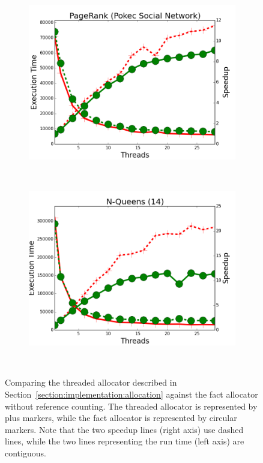 \begin{figure}[h]
\begin{subfigure}[b]{\smallplotsize\textwidth}
                \includegraphics[width=\textwidth]{experiments/scalability/no-refs-allocator-pagerank-pokec.png}
                \label{fig:implementation:no_refs_pagerank}
        \end{subfigure}
        ~
        \begin{subfigure}[b]{\smallplotsize\textwidth}
                \includegraphics[width=\textwidth]{experiments/scalability/no-refs-allocator-8queens-14.png}
                \label{fig:implementation:no_refs_queens}
        \end{subfigure} \\

        \caption{Comparing the threaded allocator described in
           Section~\ref{section:implementation:allocation} against the fact
           allocator without reference counting. The threaded allocator is
           represented by plus markers, while the fact allocator is represented
           by circular markers. Note that the two speedup lines (right axis) use
        dashed lines, while the two lines representing the run time (left axis)
     are contiguous.}

        \label{fig:implementation:no_refs_results}
\end{figure}
